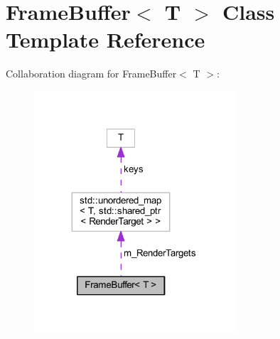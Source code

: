 \hypertarget{class_frame_buffer}{}\section{Frame\+Buffer$<$ T $>$ Class Template Reference}
\label{class_frame_buffer}


Collaboration diagram for Frame\+Buffer$<$ T $>$\+:
\nopagebreak
\begin{figure}[H]
\begin{center}
\leavevmode
\includegraphics[width=212pt]{class_frame_buffer__coll__graph}
\end{center}
\end{figure}
